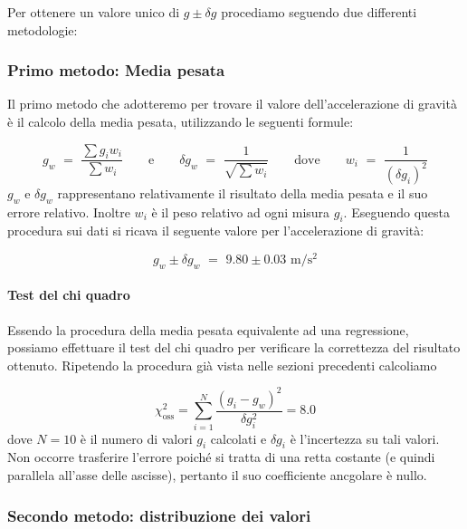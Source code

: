 Per ottenere un valore unico di $g \pm \delta g$ procediamo seguendo due differenti metodologie:

\subsubsection{Primo metodo: Media pesata}

Il primo metodo che adotteremo per trovare il valore dell'accelerazione di gravità è il calcolo della media pesata, utilizzando le seguenti formule:

\begin{equation*}
g_w \,\, = \,\, \frac{\sum g_iw_i}{\sum w_i} \quad\quad \text{e} \quad\quad \delta g_w \,\, = \,\, \frac{1}{\sqrt{\sum w_i}} \quad\quad \text{dove} \quad\quad w_i \,\, = \,\, \frac{1}{(\delta g_i)^2}
\end{equation*}
%
$g_w$ e $\delta g_w$ rappresentano relativamente il risultato della media pesata e il suo errore relativo. Inoltre $w_i$ è il peso relativo ad ogni misura $g_i$.
Eseguendo questa procedura sui dati si ricava il seguente valore per l'accelerazione di gravità:

\begin{equation}
g_w \pm \delta g_w \,\, = \,\, 9.80 \pm 0.03 \,\, \si{\metre\per\square\second}
\end{equation}

\paragraph{Test del chi quadro\\}

Essendo la procedura della media pesata equivalente ad una regressione, possiamo effettuare il test del chi quadro per verificare
la correttezza del risultato ottenuto. Ripetendo la procedura già vista nelle sezioni precedenti calcoliamo

\begin{equation}
    \chi^2_{\text{oss}} = \sum_{i=1}^N \frac{(g_i - g_w)^2}{\delta g_i^2} = 8.0
\end{equation}
%
dove $N = 10$ è il numero di valori $g_i$ calcolati e $\delta g_i$ è l'incertezza su tali valori. Non occorre trasferire
l'errore poiché si tratta di una retta costante (e quindi parallela all'asse delle ascisse), pertanto il suo coefficiente ancgolare
è nullo.

\subsubsection{Secondo metodo: distribuzione dei valori}

